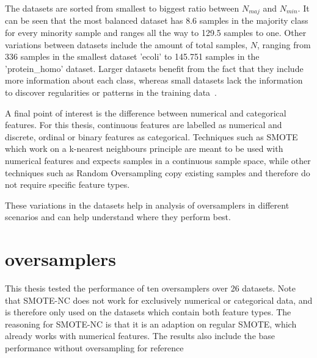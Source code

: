 The datasets are sorted from smallest to biggest ratio between $N_{maj}$ and $N_{min}$. It can be seen that the most balanced dataset has 8.6 samples in the majority class for every minority sample and ranges all the way to 129.5 samples to one. Other variations between datasets include the amount of total samples, $N$, ranging from 336 samples in the smallest dataset 'ecoli' to 145.751 samples in the 'protein\_homo' dataset. Larger datasets benefit from the fact that they include more information about each class, whereas small datasets lack the information to discover regularities or patterns in the training data~\cite{Ali2013ClassificationReview}.

A final point of interest is the difference between numerical and categorical features. For this thesis, continuous features are labelled as numerical and discrete, ordinal or binary features as categorical. Techniques such as SMOTE which work on a k-nearest neighbours principle are meant to be used with numerical features and expects samples in a continuous sample space, while other techniques such as Random Oversampling copy existing samples and therefore do not require specific feature types.

These variations in the datasets help in analysis of oversamplers in different scenarios and can help understand where they perform best.

\section{oversamplers}
This thesis tested the performance of ten oversamplers over 26 datasets. Note that SMOTE-NC does not work for exclusively numerical or categorical data, and is therefore only used on the datasets which contain both feature types. The reasoning for SMOTE-NC is that it is an adaption on regular SMOTE, which already works with numerical features. The results also include the base performance without oversampling for reference 

